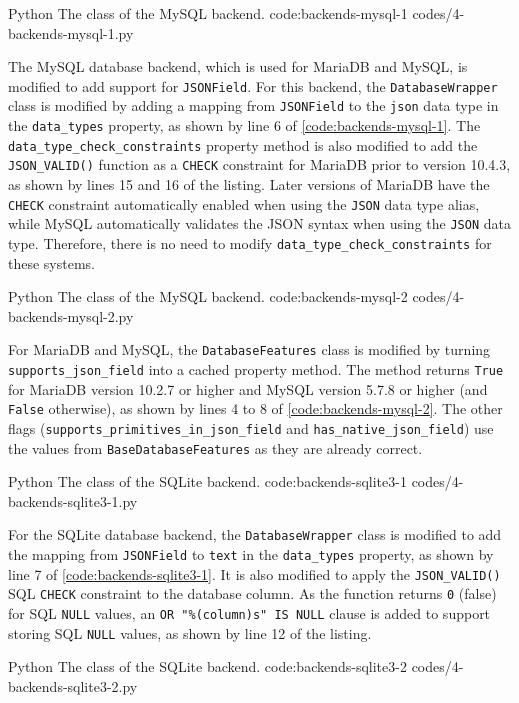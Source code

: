 \listing
{Python}
{The  class of the MySQL backend.}
{code:backends-mysql-1}
{codes/4-backends-mysql-1.py}

The MySQL database backend, which is used for MariaDB and MySQL, is modified to
add support for \verb|JSONField|. For this backend, the \verb|DatabaseWrapper|
class is modified by adding a mapping from \verb|JSONField| to the \verb|json|
data type in the \verb|data_types| property, as shown by line 6 of
\autoref{code:backends-mysql-1}. The \verb|data_type_check_constraints|
property method is also modified to add the \verb|JSON_VALID()| function as a
\verb|CHECK| constraint for MariaDB prior to version 10.4.3, as shown by lines
15 and 16 of the listing. Later versions of MariaDB have the \verb|CHECK|
constraint automatically enabled when using the \verb|JSON| data type alias,
while MySQL automatically validates the JSON syntax when using the \verb|JSON|
data type. Therefore, there is no need to modify
\verb|data_type_check_constraints| for these systems.

\listing
{Python}
{The  class of the MySQL backend.}
{code:backends-mysql-2}
{codes/4-backends-mysql-2.py}

For MariaDB and MySQL, the \verb|DatabaseFeatures| class is modified by turning
\verb|supports_json_field| into a cached property method. The method returns
\verb|True| for MariaDB version 10.2.7 or higher and MySQL version 5.7.8 or
higher (and \verb|False| otherwise), as shown by lines 4 to 8 of
\autoref{code:backends-mysql-2}. The other flags
(\verb|supports_primitives_in_json_field| and \verb|has_native_json_field|)
use the values from \verb|BaseDatabaseFeatures| as they are already correct.

\listing
{Python}
{The  class of the SQLite backend.}
{code:backends-sqlite3-1}
{codes/4-backends-sqlite3-1.py}

For the SQLite database backend, the \verb|DatabaseWrapper| class is modified
to add the mapping from \verb|JSONField| to \verb|text| in the
\verb|data_types| property, as shown by line 7 of
\autoref{code:backends-sqlite3-1}. It is also modified to apply the
\verb|JSON_VALID()| SQL \verb|CHECK| constraint to the database column. As the
function returns \verb|0| (false) for SQL \verb|NULL| values, an
\verb|OR "%(column)s" IS NULL| clause is added to support storing SQL
\verb|NULL| values, as shown by line 12 of the listing.

\listing
{Python}
{The  class of the SQLite backend.}
{code:backends-sqlite3-2}
{codes/4-backends-sqlite3-2.py}

